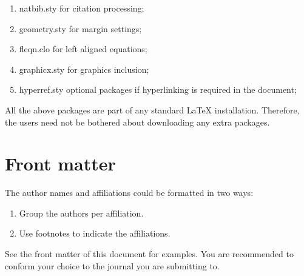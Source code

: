 \documentclass[a4paper,fleqn]{cas-dc}
\begin{document}
\begin{enumerate}
\itemsep=0pt
\item {natbib.sty} for citation processing;
\item {geometry.sty} for margin settings;
\item {fleqn.clo} for left aligned equations;
\item {graphicx.sty} for graphics inclusion;
\item {hyperref.sty} optional packages if hyperlinking is
  required in the document;
\end{enumerate}  

All the above packages are part of any
standard \LaTeX{} installation.
Therefore, the users need not be
bothered about downloading any extra packages.

\section{Front matter}

The author names and affiliations could be formatted in two ways:
\begin{enumerate}[(1)]
\item Group the authors per affiliation.
\item Use footnotes to indicate the affiliations.
\end{enumerate}
See the front matter of this document for examples. 
You are recommended to conform your choice to the journal you 
are submitting to.
\end{document}
